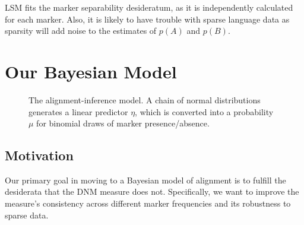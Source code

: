 \documentclass{acm_proc_article-sp}
\begin{document}
LSM fits the marker separability desideratum, as it is independently calculated for each marker. Also, it is likely to have trouble with sparse language data as sparsity will add noise to the estimates of $p(A)$ and $p(B)$.





\section{Our Bayesian Model}

\begin{figure}
  \begin{center}
    
  \end{center}
  \caption{The alignment-inference model. A chain of normal distributions generates a linear predictor $\eta$, which is converted into a probability $\mu$ for binomial draws of marker presence/absence.}\label{fig:model}
\end{figure}

\subsection{Motivation}
Our primary goal in moving to a Bayesian model of alignment is to fulfill the desiderata that the DNM measure does not.  Specifically, we want to improve the measure's consistency across different marker frequencies and its robustness to sparse data.  
\end{document}
